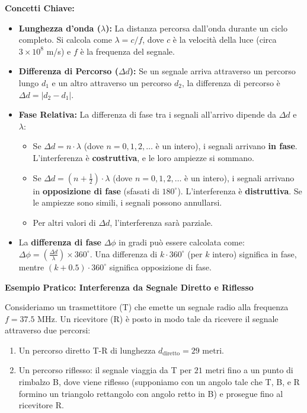 \textbf{Concetti Chiave:}
\begin{itemize}
    \item \textbf{Lunghezza d'onda ($\lambda$):} La distanza percorsa dall'onda durante un ciclo completo. Si calcola come $\lambda = c/f$, dove $c$ è la velocità della luce (circa $3 \times 10^8$ m/s) e $f$ è la frequenza del segnale.
    \item \textbf{Differenza di Percorso ($\Delta d$):} Se un segnale arriva attraverso un percorso lungo $d_1$ e un altro attraverso un percorso $d_2$, la differenza di percorso è $\Delta d = |d_2 - d_1|$.
    \item \textbf{Fase Relativa:} La differenza di fase tra i segnali all'arrivo dipende da $\Delta d$ e $\lambda$:
    \begin{itemize}
        \item Se $\Delta d = n \cdot \lambda$ (dove $n = 0, 1, 2, \ldots$ è un intero), i segnali arrivano \textbf{in fase}. L'interferenza è \textbf{costruttiva}, e le loro ampiezze si sommano.
        \item Se $\Delta d = (n + \frac{1}{2}) \cdot \lambda$ (dove $n = 0, 1, 2, \ldots$ è un intero), i segnali arrivano in \textbf{opposizione di fase} (sfasati di $180^\circ$). L'interferenza è \textbf{distruttiva}. Se le ampiezze sono simili, i segnali possono annullarsi.
        \item Per altri valori di $\Delta d$, l'interferenza sarà parziale.
    \end{itemize}
    \item La \textbf{differenza di fase} $\Delta\phi$ in gradi può essere calcolata come: $\Delta\phi = \left( \frac{\Delta d}{\lambda} \right) \times 360^\circ$. Una differenza di $k \cdot 360^\circ$ (per $k$ intero) significa in fase, mentre $(k+0.5) \cdot 360^\circ$ significa opposizione di fase.
\end{itemize}

\textbf{Esempio Pratico: Interferenza da Segnale Diretto e Riflesso}

Consideriamo un trasmettitore (T) che emette un segnale radio alla frequenza $f = 37.5 \text{ MHz}$. Un ricevitore (R) è posto in modo tale da ricevere il segnale attraverso due percorsi:
\begin{enumerate}
    \item Un percorso diretto T-R di lunghezza $d_{\text{diretto}} = 29 \text{ metri}$.
    \item Un percorso riflesso: il segnale viaggia da T per $21 \text{ metri}$ fino a un punto di rimbalzo B, dove viene riflesso (supponiamo con un angolo tale che T, B, e R formino un triangolo rettangolo con angolo retto in B) e prosegue fino al ricevitore R.
\end{enumerate}

